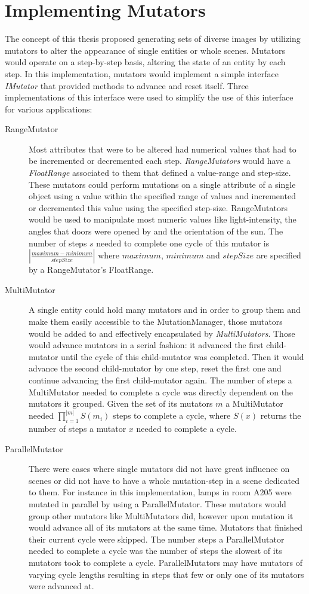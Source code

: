 \section{Implementing Mutators}
The concept of this thesis proposed generating sets of diverse images by utilizing mutators to alter the appearance of single entities or whole scenes. Mutators would operate on a step-by-step basis, altering the state of an entity by each step. In this implementation, mutators would implement a simple interface \textit{IMutator} that provided methods to advance and reset itself. Three implementations of this interface were used to simplify the use of this interface for various applications: 
\begin{description}
\item [RangeMutator] Most attributes that were to be altered had numerical values that had to be incremented or decremented each step. \textit{RangeMutators} would have a \textit{FloatRange} associated to them that defined a value-range and step-size. These mutators could perform mutations on a single attribute of a single object using a value within the specified range of values and incremented or decremented this value using the specified step-size. RangeMutators would be used to manipulate most numeric values like light-intensity, the angles that doors were opened by and the orientation of the sun. The number of steps $s$ needed to complete one cycle of this mutator is $|\frac{maximum-minimum}{stepSize}|$ where $maximum$, $minimum$ and $stepSize$ are specified by a RangeMutator's FloatRange.
\item [MultiMutator] A single entity could hold many mutators and in order to group them and make them easily accessible to the MutationManager, those mutators would be added to and effectively encapsulated by \textit{MultiMutators}. Those would advance mutators in a serial fashion: it advanced the first child-mutator until the cycle of this child-mutator was completed. Then it would advance the second child-mutator by one step, reset the first one and continue advancing the first child-mutator again. The number of steps a MultiMutator needed to complete a cycle was directly dependent on the mutators it grouped. Given the set of its mutators $m$ a MultiMutator needed $\prod_{i=1}^{|m|} S(m_i)$ steps to complete a cycle, where $S(x)$ returns the number of steps a mutator $x$ needed to complete a cycle.
\item [ParallelMutator] There were cases where single mutators did not have great influence on scenes or did not have to have a whole mutation-step in a scene dedicated to them. For instance in this implementation, lamps in room A205 were mutated in parallel by using a ParallelMutator. These mutators would group other mutators like MultiMutators did, however upon mutation it would advance all of its mutators at the same time. Mutators that finished their current cycle were skipped. The number steps a ParallelMutator needed to complete a cycle was the number of steps the slowest of its mutators took to complete a cycle. ParallelMutators may have mutators of varying cycle lengths resulting in steps that few or only one of its mutators were advanced at.
\end{description}
